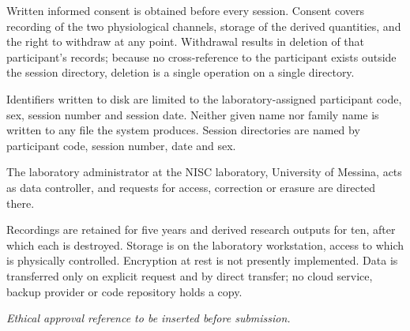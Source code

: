 Written informed consent is obtained before every session.
Consent covers recording of the two physiological channels,
storage of the derived quantities, and the right to withdraw at
any point. Withdrawal results in deletion of that participant's
records; because no cross-reference to the participant exists
outside the session directory, deletion is a single operation on
a single directory.

Identifiers written to disk are limited to the laboratory-assigned
participant code, sex, session number and session date. Neither
given name nor family name is written to any file the system
produces. Session directories are named by participant code,
session number, date and sex.

The laboratory administrator at the NISC laboratory, University
of Messina, acts as data controller, and requests for access,
correction or erasure are directed there.

Recordings are retained for five years and derived research
outputs for ten, after which each is destroyed. Storage is on the
laboratory workstation, access to which is physically controlled.
Encryption at rest is not presently implemented. Data is
transferred only on explicit request and by direct transfer; no
cloud service, backup provider or code repository holds a copy.

\textit{Ethical approval reference to be inserted before
submission.}
